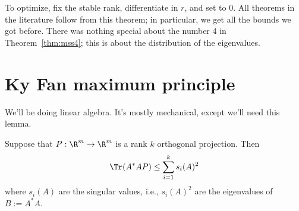 To optimize, fix the stable rank, differentiate in $r$, and set to 0. All theorems in the literature follow from this theorem; in particular, we get all the bounds we got before. %
There was nothing special about the number 4 in Theorem~\ref{thm:mss4}; this is about the distribution of the eigenvalues. 

\section{Ky Fan maximum principle}
We'll be doing linear algebra. It's mostly mechanical, except we'll need this lemma.
\begin{lem}
Suppose that $P:\R^m\to \R^m$ is a rank $k$ orthogonal projection. Then
\[
\Tr(A^*AP ) \le \sum_{i=1}^k s_i(A)^2
\]
where $s_i(A)$ are the singular values, i.e., $s_i(A)^2$ are the eigenvalues of $B:=A^*A$.
\end{lem}

